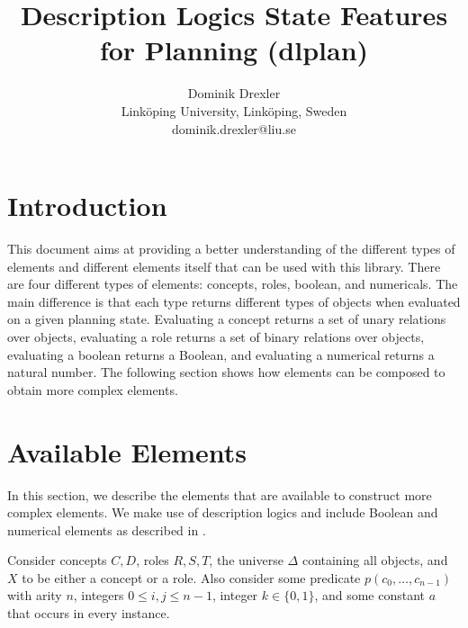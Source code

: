 \documentclass{article}
\title{
    Description Logics State Features for Planning (dlplan)
}
\author{
Dominik Drexler \\
Link{\"o}ping University, Link\"oping, Sweden\\
dominik.drexler@liu.se
}
\begin{document}
\maketitle

\newcommand{\emptyelement}[1]{\ensuremath{\mathit{Empty}(#1)}}
\newcommand{\nullaryelement}[1]{\ensuremath{\mathit{Nullary}(#1)}}

\newcommand{\countelement}[1]{\ensuremath{\mathit{Count}(#1)}}
\newcommand{\conceptdistanceelement}[3]{\ensuremath{\mathit{ConceptDistance}(#1, #2, #3)}}
\newcommand{\sumconceptdistanceelement}[3]{\ensuremath{\mathit{SumConceptDistance}(#1, #2, #3)}}
\newcommand{\roledistanceelement}[3]{\ensuremath{\mathit{RoleDistance}(#1, #2, #3)}}
\newcommand{\sumroledistanceelement}[3]{\ensuremath{\mathit{SumRoleDistance}(#1, #2, #3)}}

\section{Introduction}

This document aims at providing a better understanding of the different types of elements
and different elements itself that can be used with this library.
There are four different types of elements: concepts, roles, boolean, and numericals.
The main difference is that each type returns different types of objects when evaluated on a given planning state.
Evaluating a concept returns a set of unary relations over objects,
evaluating a role returns a set of binary relations over objects,
evaluating a boolean returns a Boolean, and
evaluating a numerical returns a natural number.
The following section shows how elements can be composed to obtain more complex elements.

\section{Available Elements}

In this section, we describe the elements that are available to construct more complex elements.
We make use of description logics \cite{baader-et-al-2003} and include Boolean and numerical
elements as described in \cite{drexler-et-al-arxiv2021}.

Consider concepts $C, D$, roles $R, S, T$,
the universe $\Delta$ containing all objects,
and $X$ to be either a concept or a role.
Also consider some predicate $p(c_0,\ldots,c_{n-1})$ with arity $n$,
integers $0\leq i,j\leq n-1$, integer $k\in\{0, 1\}$, and
some constant $a$ that occurs in every instance.
\end{document}
